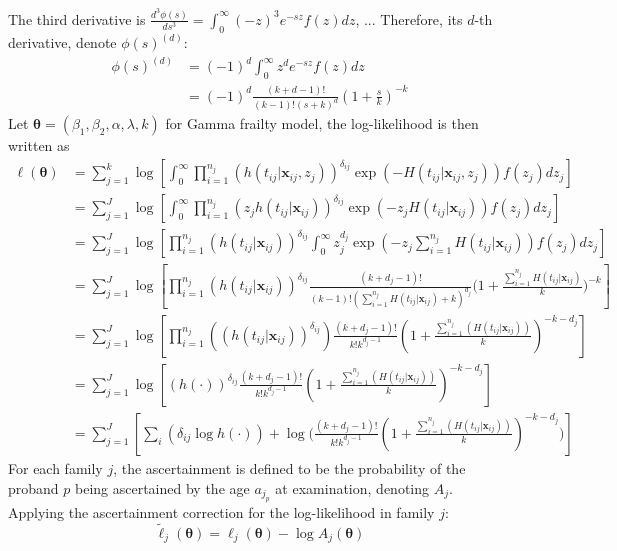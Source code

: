 \documentclass[preprint,12pt]{elsarticle}
\begin{document}
\noindent
The third derivative is $\frac{d^3\phi(s)}{ds^3}=\int_0^{\infty}(-z)^3e^{-sz}f(z)dz$, ...
Therefore, its $d$-th derivative, denote $\phi(s)^{(d)}$:
\begin{align}
    \phi(s)^{(d)}&=(-1)^d\int_0^{\infty}z^de^{-sz}f(z)dz\\
    &=(-1)^d\frac{(k+d-1)!}{(k-1)!(s+k)^d}(1+\frac{s}{k})^{-k}
\end{align}
Let $\boldsymbol{\theta}=(\beta_1, \beta_2, \alpha, \lambda, k)$ for Gamma frailty model, the log-likelihood is then written as
\begin{align}
    \ell(\boldsymbol{\theta})&=\sum_{j=1}^k\log \left [ \int_0^{\infty}\prod_{i=1}^{n_j}(h(t_{ij}|\mathbf{x}_{ij}, z_j))^{\delta_{ij}}\exp (-H(t_{ij}|\mathbf{x}_{ij}, z_j))f(z_j)dz_j\right ]\\
    &=\sum_{j=1}^J\log\left [\int_{0}^{\infty}\prod_{i=1}^{n_j}(z_j h(t_{ij}|\mathbf{x}_{ij}))^{\delta_{ij}}\exp(-z_j H(t_{ij}|\mathbf{x}_{ij}))f(z_j)dz_j\right ]\\
    &=\sum_{j=1}^J\log\left [\prod_{i=1}^{n_j}(h(t_{ij}|\mathbf{x}_{ij}))^{\delta_{ij}}\int_0^{\infty}z_j^{d_j}\exp(-z_j\sum_{i=1}^{n_j}H(t_{ij}|\mathbf{x}_{ij}))f(z_j)dz_j \right ]\\
    &=\sum_{j=1}^J\log\left [\prod_{i=1}^{n_j}(h(t_{ij}|\mathbf{x}_{ij}))^{\delta_{ij}}\frac{(k+d_j-1)!}{(k-1)!(\sum_{i=1}^{n_j}H(t_{ij}|\mathbf{x}_{ij})+k)^{d_j}}\Big(1+\frac{\sum_{i=1}^{n_j}H(t_{ij}|\mathbf{x}_{ij})}{k}\Big)^{-k}\right ]\\
    &=\sum_{j=1}^J\log\left [\prod_{i=1}^{n_j}((h(t_{ij}|\mathbf{x}_{ij}) )^{\delta_{ij}})\frac{(k+d_j-1)!}{k!k^{d_j-1}}(1+\frac{\sum_{i=1}^{n_j}(H(t_{ij}|\mathbf{x}_{ij}))}{k})^{-k-d_j} \right ]\\
    &=\sum_{j=1}^J\log\left [(h(\cdot))^{\delta_{ij}} \frac{(k+d_j-1)!}{k!k^{d_j-1}}(1+\frac{\sum_{i=1}^{n_j}(H(t_{ij}|\mathbf{x}_{ij}))}{k})^{-k-d_j} \right ]\\
    &=\sum_{j=1}^J\left [\sum_i(\delta_{ij}\log h(\cdot)) + \log\Big (\frac{(k+d_j-1)!}{k!k^{d_j-1}}(1+\frac{\sum_{i=1}^{n_j}(H(t_{ij}|\mathbf{x}_{ij}))}{k})^{-k-d_j}\Big )\right ]
\end{align}
For each family $j$, the ascertainment is defined to be the probability of the proband $p$ being ascertained by the age $a_{j_p}$ at examination, denoting $A_j$. Applying the ascertainment correction for the log-likelihood in family $j$: 
\begin{equation}
    \tilde{\ell}_{j}(\boldsymbol{\theta})=\ell_j(\boldsymbol{\theta})-\log A_j(\boldsymbol{\theta})
\end{equation}
\end{document}
